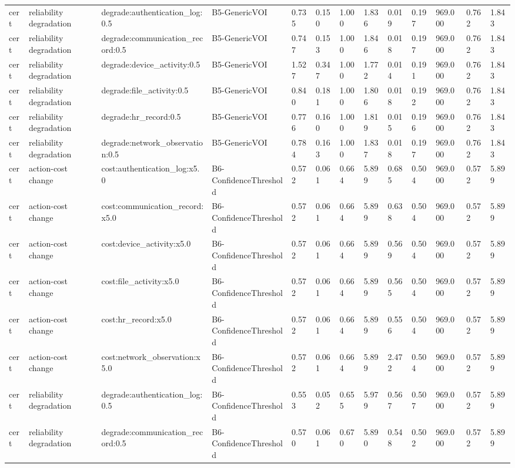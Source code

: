 \begin{table}[!ht]
{\begin{tabular}{lllllllllllll}
cert & reliability degradation & degrade:authentication\_log:0.5 & B5-GenericVOI & 0.735 & 0.150 & 1.000 & 1.836 & 0.019 & 0.197 & 969.000 & 0.762 & 1.843 \\
cert & reliability degradation & degrade:communication\_record:0.5 & B5-GenericVOI & 0.747 & 0.153 & 1.000 & 1.846 & 0.018 & 0.197 & 969.000 & 0.762 & 1.843 \\
cert & reliability degradation & degrade:device\_activity:0.5 & B5-GenericVOI & 1.527 & 0.347 & 1.000 & 1.772 & 0.014 & 0.191 & 969.000 & 0.762 & 1.843 \\
cert & reliability degradation & degrade:file\_activity:0.5 & B5-GenericVOI & 0.840 & 0.181 & 1.000 & 1.806 & 0.018 & 0.192 & 969.000 & 0.762 & 1.843 \\
cert & reliability degradation & degrade:hr\_record:0.5 & B5-GenericVOI & 0.776 & 0.160 & 1.000 & 1.819 & 0.015 & 0.196 & 969.000 & 0.762 & 1.843 \\
cert & reliability degradation & degrade:network\_observation:0.5 & B5-GenericVOI & 0.784 & 0.163 & 1.000 & 1.837 & 0.018 & 0.197 & 969.000 & 0.762 & 1.843 \\
cert & action-cost change & cost:authentication\_log:x5.0 & B6-ConfidenceThreshold & 0.572 & 0.061 & 0.664 & 5.899 & 0.685 & 0.504 & 969.000 & 0.572 & 5.899 \\
cert & action-cost change & cost:communication\_record:x5.0 & B6-ConfidenceThreshold & 0.572 & 0.061 & 0.664 & 5.899 & 0.638 & 0.504 & 969.000 & 0.572 & 5.899 \\
cert & action-cost change & cost:device\_activity:x5.0 & B6-ConfidenceThreshold & 0.572 & 0.061 & 0.664 & 5.899 & 0.569 & 0.504 & 969.000 & 0.572 & 5.899 \\
cert & action-cost change & cost:file\_activity:x5.0 & B6-ConfidenceThreshold & 0.572 & 0.061 & 0.664 & 5.899 & 0.565 & 0.504 & 969.000 & 0.572 & 5.899 \\
cert & action-cost change & cost:hr\_record:x5.0 & B6-ConfidenceThreshold & 0.572 & 0.061 & 0.664 & 5.899 & 0.556 & 0.504 & 969.000 & 0.572 & 5.899 \\
cert & action-cost change & cost:network\_observation:x5.0 & B6-ConfidenceThreshold & 0.572 & 0.061 & 0.664 & 5.899 & 2.472 & 0.504 & 969.000 & 0.572 & 5.899 \\
cert & reliability degradation & degrade:authentication\_log:0.5 & B6-ConfidenceThreshold & 0.553 & 0.052 & 0.655 & 5.979 & 0.567 & 0.507 & 969.000 & 0.572 & 5.899 \\
cert & reliability degradation & degrade:communication\_record:0.5 & B6-ConfidenceThreshold & 0.570 & 0.061 & 0.670 & 5.890 & 0.548 & 0.502 & 969.000 & 0.572 & 5.899 \\

\end{tabular}}
\end{table}
